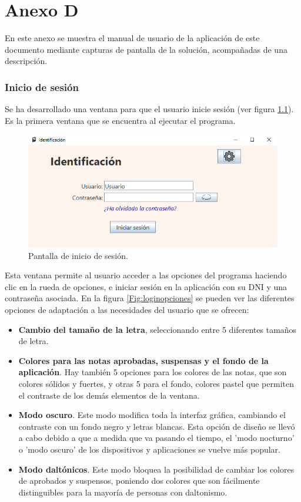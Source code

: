 \chapter{Anexo D}
\label{cap:AnexoD}

En este anexo se muestra el manual de usuario de la aplicación de este documento mediante capturas de pantalla de la solución, acompañadas de una descripción.

\subsection{Inicio de sesión}
Se ha desarrollado una ventana para que el usuario inicie sesión (ver figura \ref{Fig:login}). Es la primera ventana que se encuentra al ejecutar el programa.

\begin{figure}[h]
\centering\includegraphics[width=1\linewidth]{figs/login.png}
\caption{Pantalla de inicio de sesión.}
\label{Fig:login}
\end{figure}

Esta ventana permite al usuario acceder a las opciones del programa haciendo clic en la rueda de opciones, e iniciar sesión en la aplicación con su DNI y una contraseña asociada. En la figura \ref{Fig:loginopciones} se pueden ver las diferentes opciones de adaptación a las necesidades del usuario que se ofrecen:
\begin{itemize}
	\item \textbf{Cambio del tamaño de la letra}, seleccionando entre 5 diferentes tamaños de letra.
	\item \textbf{Colores para las notas aprobadas, suspensas y el fondo de la aplicación}. Hay también 5 opciones para los colores de las notas, que son colores sólidos y fuertes, y otras 5 para el fondo, colores pastel que permiten el contraste de los demás elementos de la ventana.
	\item \textbf{Modo oscuro}. Este modo modifica toda la interfaz gráfica, cambiando el contraste con un fondo negro y letras blancas. Esta opción de diseño se llevó a cabo debido a que a medida que va pasando el tiempo, el 'modo nocturno' o 'modo oscuro' de los dispositivos y aplicaciones se vuelve más popular.
	\item \textbf{Modo daltónicos}. Este modo bloquea la posibilidad de cambiar los colores de aprobados y suspensos, poniendo dos colores que son fácilmente distinguibles para la mayoría de personas con daltonismo.
\end{itemize}

